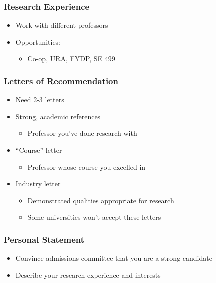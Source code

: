 \documentclass{beamer}
\begin{document}
\begin{frame}
  \frametitle{Research Experience}
  \begin{itemize}
    \item Work with different professors
    \item Opportunities:
      \begin{itemize}
        \item Co-op, URA, FYDP, SE 499
      \end{itemize}
  \end{itemize}
\end{frame}

\begin{frame}
  \frametitle{Letters of Recommendation}
  \begin{itemize}
    \item Need 2-3 letters
    \item Strong, academic references
      \begin{itemize}
        \item Professor you've done research with
      \end{itemize}
    \item ``Course'' letter
      \begin{itemize}
        \item Professor whose course you excelled in
      \end{itemize}
    \item Industry letter
      \begin{itemize}
        \item Demonstrated qualities appropriate for research
        \item Some universities won't accept these letters
      \end{itemize}
  \end{itemize}
\end{frame}

\begin{frame}
  \frametitle{Personal Statement}
  \begin{itemize}
    \item Convince admissions committee that you are a strong candidate
    \item Describe your research experience and interests
  \end{itemize}
\end{frame}
\end{document}
